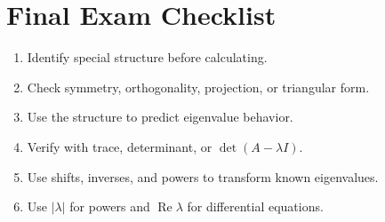 \documentclass[10pt]{article}
\begin{document}
\section{Final Exam Checklist}

\begin{enumerate}
  \item Identify special structure before calculating.
  \item Check symmetry, orthogonality, projection, or triangular form.
  \item Use the structure to predict eigenvalue behavior.
  \item Verify with trace, determinant, or \(\det(A-\lambda I)\).
  \item Use shifts, inverses, and powers to transform known eigenvalues.
  \item Use \(|\lambda|\) for powers and \(\operatorname{Re}\lambda\) for differential equations.
\end{enumerate}
\end{document}
